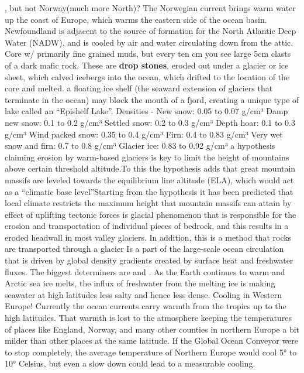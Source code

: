 	, but not Norway(much more North)? The Norwegian current brings warm water up the coast of Europe, which warms the eastern side of the ocean basin. Newfoundland is adjacent to the source of formation for the North Atlantic Deep Water (NADW), and is cooled by air and water circulating down from the attic. 
	 \ddd Core w/ primarily fine grained muds, but every ten cm you see large 5cm clasts of a dark mafic rock. These are \textbf{drop stones}, eroded out under a glacier or ice sheet, which calved icebergs into the ocean, which drifted to the location of the core and melted.
	 a floating ice shelf (the seaward extension of glaciers that terminate in the ocean) may block the mouth of a fjord, creating a unique type of lake called an “Epishelf Lake”.
	Densities - New snow: 0.05 to 0.07 g/cm³ Damp new snow: 0.1 to 0.2 g/cm³ Settled snow: 0.2 to 0.3 g/cm³ Depth hoar: 0.1 to 0.3 g/cm³ Wind packed snow: 0.35 to 0.4 g/cm³ Firn: 0.4 to 0.83 g/cm³ Very wet snow and firn: 0.7 to 0.8 g/cm³ Glacier ice: 0.83 to 0.92 g/cm³
		a hypothesis claiming erosion by warm-based glaciers is key to limit the height of mountains above certain threshold altitude.To this the hypothesis adds that great mountain massifs are leveled towards the equilibrium line altitude (ELA), which would act as a “climatic base level”Starting from the hypothesis it has been predicted that local climate restricts the maximum height that mountain massifs can attain by effect of uplifting tectonic forces
		is glacial phenomenon that is responsible for the erosion and transportation of individual pieces of bedrock, and this results in a eroded headwall in most valley glaciers. In addition, this is a method that rocks are transported through a glacier
		Is a part of the large-scale ocean circulation that is driven by global density gradients created by surface heat and freshwater fluxes. The biggest determiners are  and .
		As the Earth continues to warm and Arctic sea ice melts, the influx of freshwater from the melting ice is making seawater at high latitudes less salty and hence less dense.
		Cooling in Western Europe! Currently the ocean currents carry warmth from the tropics up to the high latitudes. That warmth is lost to the atmosphere keeping the temperatures of places like England, Norway, and many other counties in northern Europe a bit milder than other places at the same latitude. If the Global Ocean Conveyor were to stop completely, the average temperature of Northern Europe would cool 5° to 10° Celsius, but even a slow down could lead to a measurable cooling.
